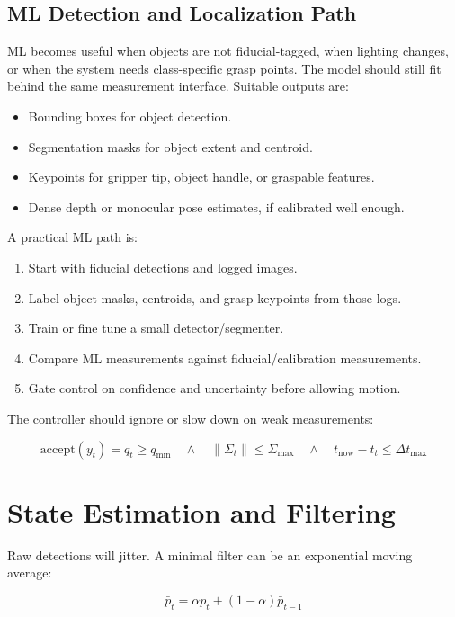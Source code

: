 \documentclass[11pt]{article}
\begin{document}
\subsection{ML Detection and Localization Path}

ML becomes useful when objects are not fiducial-tagged, when lighting changes,
or when the system needs class-specific grasp points. The model should still
fit behind the same measurement interface. Suitable outputs are:

\begin{itemize}[leftmargin=*]
    \item Bounding boxes for object detection.
    \item Segmentation masks for object extent and centroid.
    \item Keypoints for gripper tip, object handle, or graspable features.
    \item Dense depth or monocular pose estimates, if calibrated well enough.
\end{itemize}

A practical ML path is:

\begin{enumerate}[leftmargin=*]
    \item Start with fiducial detections and logged images.
    \item Label object masks, centroids, and grasp keypoints from those logs.
    \item Train or fine tune a small detector/segmenter.
    \item Compare ML measurements against fiducial/calibration measurements.
    \item Gate control on confidence and uncertainty before allowing motion.
\end{enumerate}

The controller should ignore or slow down on weak measurements:

\[
    \text{accept}(y_t) =
    q_t \ge q_{\min}
    \quad \land \quad
    \|\Sigma_t\| \le \Sigma_{\max}
    \quad \land \quad
    t_{\text{now}} - t_t \le \Delta t_{\max}
\]

\section{State Estimation and Filtering}

Raw detections will jitter. A minimal filter can be an exponential moving
average:

\[
    \bar{p}_t = \alpha p_t + (1-\alpha)\bar{p}_{t-1}
\]
\end{document}

